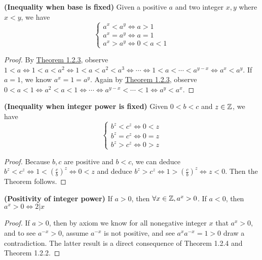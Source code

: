 \documentclass{report}
\begin{document}
\begin{theorem}
    \label{1.2.10}
  
\textbf{(Inequality when base is fixed)} Given a positive $a$ and two integer  $x,y$ where  $x<y$, we have
\begin{equation}
\begin{cases}
  a^x<a^y\iff a>1\\
  a^x=a^y \iff a=1 \\
  a^x>a^y \iff 0<a<1  
\end{cases}
\end{equation}
\end{theorem}
\begin{proof}
By \hyperref[1.2.3]{Theorem 1.2.3}, observe $1<a\iff  1<a<a^2\iff   1<a<a^2<a^3\iff  \cdots  \iff  1<a<\cdots <a^{y-x}\iff  a^x<a^y$. If $a=1$, we know  $a^x=1=a^y$. Again by \hyperref[1.2.3]{Theorem 1.2.3}, observe $0<a<1\iff  a^2<a<1\iff  \cdots \iff  a^{y-x}<\cdots <1\iff  a^{y}<a^{x}$. 
\end{proof}
\begin{theorem}
    \label{1.2.11} 
\textbf{(Inequality when integer power is fixed)} Given $0<b<c$ and  $z\in\mathbb{Z}$, we have 
\begin{equation}
\begin{cases}
  b^z<c^z \iff 0<z\\
  b^z=c^z \iff 0=z\\
  b^z>c^z\iff 0>z
\end{cases}
\end{equation}
\end{theorem}
\begin{proof}
Because $b,c$ are positive and  $b<c$, we can deduce $b^z<c^z\iff 1<(\frac{c}{b})^z \iff 0<z$ and deduce $b^z>c^z\iff 1>(\frac{c}{b})^z\iff z<0$. Then the Theorem follows.
\end{proof}
\begin{theorem}
\textbf{(Positivity of integer power)} If $a>0$, then $\forall x\in\mathbb{Z},a^x>0$. If  $a<0$, then  $a^x>0\iff 2|x$
\end{theorem}
\begin{proof}
If $a>0$, then by axiom we know for all nonegative integer  $x$ that  $a^x>0$, and to see  $a^{-x}>0$, assume $a^{-x}$ is not positive, and see $a^xa^{-x}=1>0$ draw a contradiction. The latter result is a direct consequence of Theorem 1.2.4 and Theorem 1.2.2.  
\end{proof}
\end{document}
